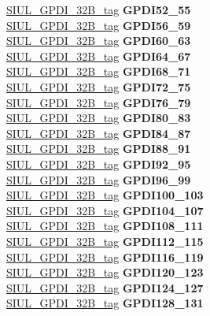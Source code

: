 \begin{DoxyCompactItemize}
\begin{tabbing}
\>\>\mbox{\hyperlink{unionSIUL__GPDI__32B__tag}{SIUL\_GPDI\_32B\_tag}} {\bfseries GPDI52\_55}\\
\>\>\mbox{\hyperlink{unionSIUL__GPDI__32B__tag}{SIUL\_GPDI\_32B\_tag}} {\bfseries GPDI56\_59}\\
\>\>\mbox{\hyperlink{unionSIUL__GPDI__32B__tag}{SIUL\_GPDI\_32B\_tag}} {\bfseries GPDI60\_63}\\
\>\>\mbox{\hyperlink{unionSIUL__GPDI__32B__tag}{SIUL\_GPDI\_32B\_tag}} {\bfseries GPDI64\_67}\\
\>\>\mbox{\hyperlink{unionSIUL__GPDI__32B__tag}{SIUL\_GPDI\_32B\_tag}} {\bfseries GPDI68\_71}\\
\>\>\mbox{\hyperlink{unionSIUL__GPDI__32B__tag}{SIUL\_GPDI\_32B\_tag}} {\bfseries GPDI72\_75}\\
\>\>\mbox{\hyperlink{unionSIUL__GPDI__32B__tag}{SIUL\_GPDI\_32B\_tag}} {\bfseries GPDI76\_79}\\
\>\>\mbox{\hyperlink{unionSIUL__GPDI__32B__tag}{SIUL\_GPDI\_32B\_tag}} {\bfseries GPDI80\_83}\\
\>\>\mbox{\hyperlink{unionSIUL__GPDI__32B__tag}{SIUL\_GPDI\_32B\_tag}} {\bfseries GPDI84\_87}\\
\>\>\mbox{\hyperlink{unionSIUL__GPDI__32B__tag}{SIUL\_GPDI\_32B\_tag}} {\bfseries GPDI88\_91}\\
\>\>\mbox{\hyperlink{unionSIUL__GPDI__32B__tag}{SIUL\_GPDI\_32B\_tag}} {\bfseries GPDI92\_95}\\
\>\>\mbox{\hyperlink{unionSIUL__GPDI__32B__tag}{SIUL\_GPDI\_32B\_tag}} {\bfseries GPDI96\_99}\\
\>\>\mbox{\hyperlink{unionSIUL__GPDI__32B__tag}{SIUL\_GPDI\_32B\_tag}} {\bfseries GPDI100\_103}\\
\>\>\mbox{\hyperlink{unionSIUL__GPDI__32B__tag}{SIUL\_GPDI\_32B\_tag}} {\bfseries GPDI104\_107}\\
\>\>\mbox{\hyperlink{unionSIUL__GPDI__32B__tag}{SIUL\_GPDI\_32B\_tag}} {\bfseries GPDI108\_111}\\
\>\>\mbox{\hyperlink{unionSIUL__GPDI__32B__tag}{SIUL\_GPDI\_32B\_tag}} {\bfseries GPDI112\_115}\\
\>\>\mbox{\hyperlink{unionSIUL__GPDI__32B__tag}{SIUL\_GPDI\_32B\_tag}} {\bfseries GPDI116\_119}\\
\>\>\mbox{\hyperlink{unionSIUL__GPDI__32B__tag}{SIUL\_GPDI\_32B\_tag}} {\bfseries GPDI120\_123}\\
\>\>\mbox{\hyperlink{unionSIUL__GPDI__32B__tag}{SIUL\_GPDI\_32B\_tag}} {\bfseries GPDI124\_127}\\
\>\>\mbox{\hyperlink{unionSIUL__GPDI__32B__tag}{SIUL\_GPDI\_32B\_tag}} {\bfseries GPDI128\_131}\\

\end{tabbing}
\end{DoxyCompactItemize}
